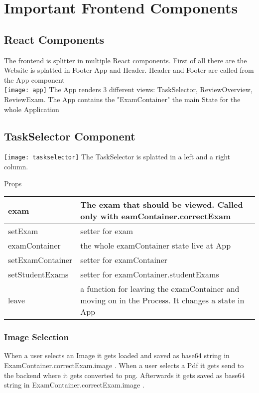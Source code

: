 \author{Paul Hoffmann}
\graphicspath{ {./src/chapters/developer/media/} }

\chapter{Important Frontend Components}
\section{React Components}
The frontend is splitter in multiple React components. First of all
there are the Website is splatted in Footer App and Header. Header
and Footer are called from the App component\\
\texttt{[image: app]}
The App renders 3 different views: TaskSelector, ReviewOverview,
ReviewExam. 
The App contains the "ExamContainer" the main State for the whole
Application

\section{TaskSelector Component}
\texttt{[image: taskselector]}
The TaskSelector is splatted in a left and a right column.

Props\\
\begin{tabularx}{\textwidth}{|l|X|} 
\hline
exam & The exam that should be viewed. Called only with
eamContainer.correctExam \\
\hline
setExam & setter for exam \\
\hline
examContainer & the whole examContainer state live at App\\
\hline
setExamContainer & setter for examContainer \\
\hline
setStudentExams & setter for examContainer.studentExams \\
\hline
leave & a function for leaving the examContainer and moving on in
the Process. It changes a state in App \\
\hline

\end{tabularx}

\subsection{Image Selection}
When a user selects an Image it gets loaded and saved as base64
string in ExamContainer.correctExam.image .
When a user selects a Pdf it gets send to the backend where it gets
converted to png. Afterwards it gets saved as base64 string in
ExamContainer.correctExam.image . 

